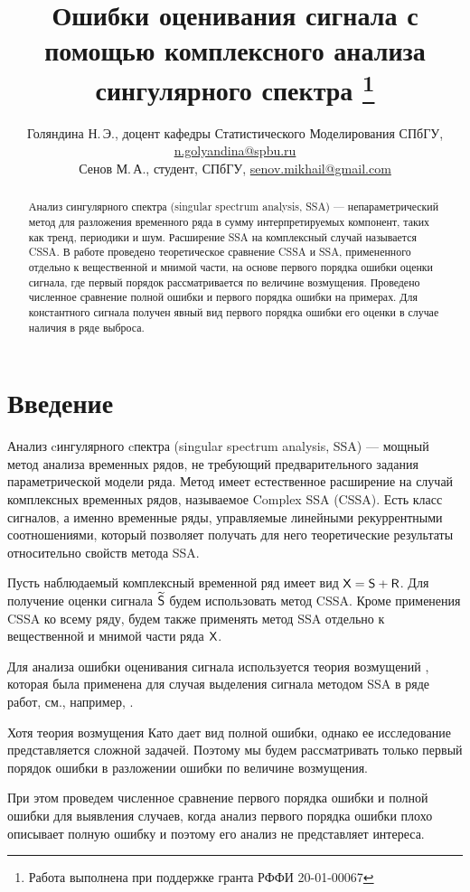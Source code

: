 \documentclass{spisok-article}
\title{Ошибки оценивания сигнала с помощью комплексного анализа сингулярного спектра
    \thanks{Работа выполнена при поддержке гранта РФФИ 20-01-00067}
}
\author{Голяндина Н.\,Э., доцент кафедры Статистического Моделирования СПбГУ,
    \href{mailto:n.golyandina@spbu.ru}{n.golyandina@spbu.ru }\\
    Сенов М.\,А., студент, СПбГУ,
    \href{mailto:senov.mikhail@gmail.com}{senov.mikhail@gmail.com}%
}
\begin{document}
\maketitle

\begin{abstract}
Анализ сингулярного спектра (singular spectrum analysis, SSA)
--- непараметрический метод для разложения временного ряда в сумму
интерпретируемых компонент, таких как тренд, периодики и шум. Расширение SSA на комплексный случай называется CSSA. 
В работе проведено теоретическое сравнение CSSA и SSA, примененного отдельно к вещественной и мнимой части, на основе первого порядка ошибки оценки сигнала, где первый порядок рассматривается по величине возмущения. Проведено численное сравнение полной ошибки и первого порядка ошибки на примерах. Для константного сигнала получен явный вид первого порядка ошибки его оценки в случае наличия в ряде выброса.
\end{abstract}

\section{Введение}
Анализ cингулярного cпектра (singular spectrum analysis, SSA)  \cite{Golyandina.etal2001}
 --- мощный метод анализа временных
рядов, не требующий предварительного задания параметрической модели ряда. Метод имеет естественное расширение на случай комплексных временных рядов, называемое Complex SSA (CSSA).
Есть класс сигналов, а именно временные ряды, управляемые линейными рекуррентными соотношениями, который позволяет получать для него теоретические результаты относительно свойств метода SSA.

Пусть наблюдаемый комплексный временной ряд имеет вид $\textsf{X} =\textsf{S} + \textsf{R}$. Для получение оценки сигнала $\widetilde{\textsf{S}}$ будем использовать метод CSSA. Кроме применения CSSA ко всему ряду, будем также применять метод SSA отдельно к вещественной и мнимой части ряда $\textsf{X}$.

Для анализа ошибки оценивания сигнала используется теория возмущений \cite{Kato}, которая была применена для случая выделения сигнала методом SSA в ряде работ, см., например, \cite{Nekrutkin}.

Хотя теория возмущения Като дает вид полной ошибки, однако ее исследование представляется сложной задачей. Поэтому мы будем рассматривать только первый порядок ошибки в разложении ошибки по величине возмущения.

При этом проведем численное сравнение первого порядка ошибки и полной ошибки для выявления случаев, когда анализ первого порядка ошибки плохо описывает полную ошибку и поэтому его анализ не представляет интереса.
\end{document}
